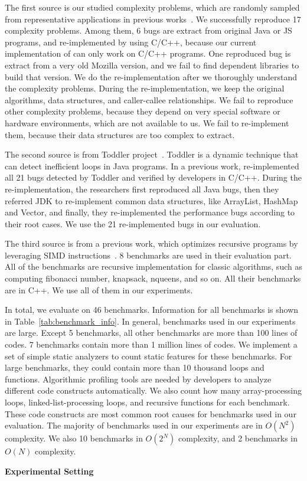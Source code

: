 The first source is our studied complexity problems, 
which are randomly sampled from representative applications in previous works~\cite{PerfBug,SongOOPSLA2014}.
We successfully reproduce 17 complexity problems. 
Among them, 6 bugs are extract from original Java or JS programs, 
and re-implemented by using C/C++, 
because our current implementation of \Tool can only work on C/C++ programs.
One reproduced bug is extract from a very old Mozilla version, 
and we fail to find dependent libraries to build that version. 
We do the re-implementation after we thoroughly understand the complexity problems.
During the re-implementation, we keep the original algorithms, 
data structures, and caller-callee relationships. 
We fail to reproduce other complexity problems, 
because they depend on very special software or hardware environments, 
which are not available to us. 
We fail to re-implement them, 
because their data structures are too complex to extract.

The second source is from Toddler project~\cite{Alabama}. 
Toddler is a dynamic technique that can detect inefficient loops in Java programs.
In a previous work, \citet{ldoctor} re-implemented all 
21 bugs detected by Toddler and verified by developers in C/C++.
During the re-implementation, the researchers first reproduced all Java bugs, 
then they referred JDK to re-implement 
common data structures, like ArrayList, HashMap and Vector, 
and finally, they re-implemented the performance bugs according to their root cases. 
We use the 21 re-implemented bugs in our evaluation.  

The third source is from a previous work, 
which optimizes recursive programs by leveraging SIMD instructions~\cite{ren-bin}. 
8 benchmarks are used in their evaluation part. 
All of the benchmarks are recursive implementation for classic algorithms, 
such as computing fibonacci number, knapsack, nqueens, and so on. 
All their benchmarks are in C++. 
We use all of them in our experiments. 

In total, we evaluate \Tool on 46 benchmarks. 
Information for all benchmarks is shown in Table~\ref{tab:benchmark_info}.
In general, benchmarks used in our experiments are large. 
Except 5 benchmarks, all other benchmarks are more than 100 lines of codes. 
7 benchmarks contain more than 1 million lines of codes. 
We implement a set of simple static analyzers to count static features for these benchmarks. 
For large benchmarks, 
they could contain more than 10 thousand loops and functions.
Algorithmic profiling tools are needed by developers to 
analyze different code constructs automatically.
We also count how many array-processing loops, 
linked-list-processing loops, and recursive functions for each benchmark.
These code constructs are most common root causes for 
benchmarks used in our evaluation.  
The majority of benchmarks used in our experiments are in $O(N^2)$ complexity. 
We also 10 benchmarks in $O(2^N)$ complexity, and 2 benchmarks in $O(N)$ complexity. 

\noindent\textbf{Experimental Setting}

